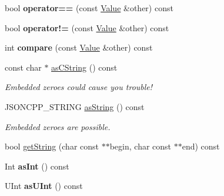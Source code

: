 \begin{DoxyCompactItemize}
\item 
\mbox{\label{classJson_1_1Value_a16f9250e30d5c4505cd11137c564a764}} 
bool {\bfseries operator==} (const \hyperlink{classJson_1_1Value}{Value} \&other) const
\item 
\mbox{\label{classJson_1_1Value_a86e95be072e515c48abc61dec63a1689}} 
bool {\bfseries operator!=} (const \hyperlink{classJson_1_1Value}{Value} \&other) const
\item 
\mbox{\label{classJson_1_1Value_aefa4464ca1bb0bcc9a87b38ed62ca2e0}} 
int {\bfseries compare} (const \hyperlink{classJson_1_1Value}{Value} \&other) const
\item 
\mbox{\label{classJson_1_1Value_a16668c8db7ef0a5de040012f0dfd84b0}} 
const char $\ast$ \hyperlink{classJson_1_1Value_a16668c8db7ef0a5de040012f0dfd84b0}{as\+C\+String} () const
\begin{DoxyCompactList}\small\item\em Embedded zeroes could cause you trouble! \end{DoxyCompactList}\item 
\mbox{\label{classJson_1_1Value_ae3f9b0d38f820ccdd8888aa92ea6e792}} 
J\+S\+O\+N\+C\+P\+P\+\_\+\+S\+T\+R\+I\+NG \hyperlink{classJson_1_1Value_ae3f9b0d38f820ccdd8888aa92ea6e792}{as\+String} () const
\begin{DoxyCompactList}\small\item\em Embedded zeroes are possible. \end{DoxyCompactList}\item 
bool \hyperlink{classJson_1_1Value_a2e1b7be6bde2fe23f15290d9ddbbdf8a}{get\+String} (char const $\ast$$\ast$begin, char const $\ast$$\ast$end) const
\item 
\mbox{\label{classJson_1_1Value_a614d635bc248a592593feb322cd15ab8}} 
Int {\bfseries as\+Int} () const
\item 
\mbox{\label{classJson_1_1Value_a74b305583ec3aacf4f9dd06e799dc265}} 
U\+Int {\bfseries as\+U\+Int} () const
\item 
\mbox{\label{classJson_1_1Value_af7371262e51d5c564908f5aa684516d1}} 

\end{DoxyCompactItemize}
